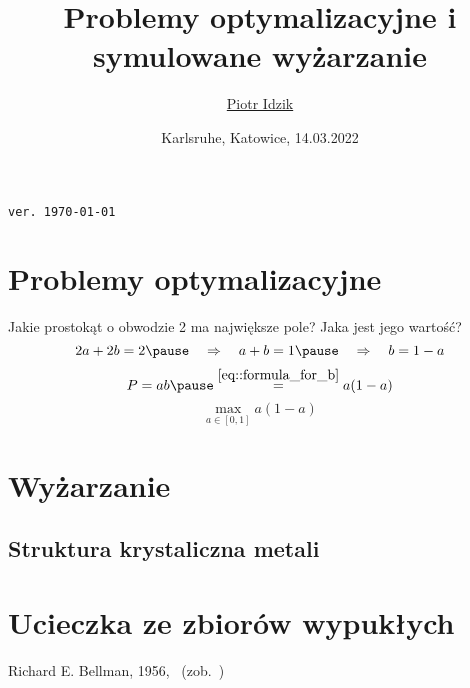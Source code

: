 \documentclass[aspectratio=169]{beamer}
\author{\texorpdfstring{\href{\myLinkedinLink}{Piotr Idzik} \\ \email{\myEmail}}{Piotr Idzik}}
\title{Problemy optymalizacyjne i symulowane wyżarzanie}
\date{Karlsruhe, Katowice, 14.03.2022}
\newcommand{\myLinkedinLink}{https://www.linkedin.com/in/piotr-idzik-34b572151/}
\newcommand{\myGithubLink}{https://github.com/vil02/}
\newcommand{\myLinkedin}{\href{\myLinkedinLink}{\faLinkedinSquare}}
\newcommand{\myGithub}{\href{\myGithubLink}{\faGithubSquare}}
\newcommand{\paren}[1]{\!\left(#1 \right)}
\begin{document}
\begin{frame}[plain]
\maketitle

\myLinkedin{}
\myGithub{}
\hfill \textcolor[rgb]{0.85,0.85,0.85}{\texttt{\tiny{ver. \today\ \currenttime}}}
\end{frame}
\section{Problemy optymalizacyjne}
\begin{frame}
Jakie prostokąt o obwodzie 2 ma największe pole?
\pause{}
Jaka jest jego wartość?
\pause{}
\begin{equation} \label{eq::formula_for_b}
2a+2b = 2 \pause \quad \Rightarrow \quad a+b = 1 \pause \quad \Rightarrow \quad b=1-a
\end{equation}
\pause{}
\begin{equation*}
P = ab \pause \stackrel{\eqref{eq::formula_for_b}}{=} a\paren{1-a}
\end{equation*}
\pause{}
\begin{equation*}
\max_{a \in [0, 1]} a\paren{1-a}
\end{equation*}
\pause{}
\begin{figure}
  \center{}
  {\rectangleAreaPlotTex}
\end{figure}

\end{frame}

\section{Wyżarzanie}
\subsection{Struktura krystaliczna metali}
{\crystalsExamplesTex}

\section{Ucieczka ze zbiorów wypukłych}

\begin{frame}
  \begin{figure}
    \center{}
    {\lostInForestExTex}
  \end{figure}
  \pause{}
  Richard E. Bellman, 1956,~\cite{Bellman1956} (zob.~\cite{Williams2000, FinchWetzel2004})
\end{frame}
\end{document}
